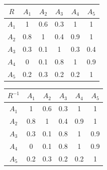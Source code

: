 \documentclass[a5paper,doc,10pt,noapacite]{apa6}
\begin{document}
{{\begin{table}[H]
	\fontsize{7}{11}\selectfont
    \begin{minipage}{.5\linewidth}
      \centering
	\begin{tabular}{c|ccccc} \thickline
	\(R\) & \(A_1\) & \(A_2\) & \(A_3\) & \(A_4\) & \(A_5\)  \\ \hline
    \(A_1\) & 1 & 0.6 & 0.3 & 1 & 1  \\
    \(A_2\) & 0.8 & 1 & 0.4 & 0.9 & 1  \\
	\(A_3\) & 0.3 & 0.1 & 1 & 0.3 & 0.4   \\
	\(A_4\) & 0 & 0.1 & 0.8 & 1 & 0.9   \\
	\(A_5\) & 0.2 & 0.3 & 0.2 & 0.2 & 1   \\
\end{tabular}
\label{tab:B2} 
    \end{minipage}%
    \begin{minipage}{.5\linewidth}
      \centering
	\begin{tabular}{c|ccccc} \thickline
	\(R^{-1}\) & \(A_1\) & \(A_2\) & \(A_3\) & \(A_4\) & \(A_5\)  \\ \hline
    \(A_1\) & 1 & 0.6 & 0.3 & 1 & 1  \\
    \(A_2\) & 0.8 & 1 & 0.4 & 0.9 & 1  \\
	\(A_3\) & 0.3 & 0.1 & 0.8 & 1 & 0.9   \\
	\(A_4\) & 0 & 0.1 & 0.8 & 1 & 0.9   \\
	\(A_5\) & 0.2 & 0.3 & 0.2 & 0.2 & 1   \\
\end{tabular}
\label{tab:B3}
    \end{minipage} 
\end{table}
%

}}
\end{document}
